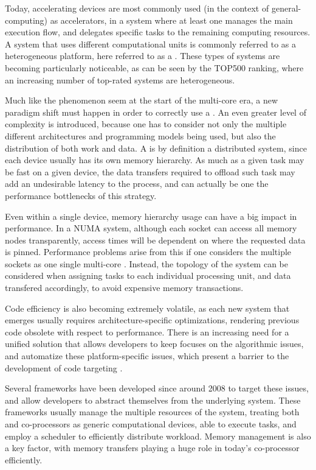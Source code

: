 \documentclass[main.tex]{subfiles}
\begin{document}
Today, accelerating devices are most commonly used (in the context of general-computing) as accelerators, in a system where at least one \cpu manages the main execution flow, and delegates specific tasks to the remaining computing resources. A system that uses different computational units is commonly referred to as a heterogeneous platform, here referred to as a \hetplat. These types of systems are becoming particularly noticeable, as can be seen by the TOP500 ranking, where an increasing number of top-rated systems are heterogeneous.

Much like the phenomenon seem at the start of the multi-core era, a new paradigm shift must happen in order to correctly use a \hetplat. An even greater level of complexity is introduced, because one has to consider not only the multiple different architectures and programming models being used, but also the distribution of both work and data. A \hetplat is by definition a distributed system, since each device usually has its own memory hierarchy. As much as a given task may be fast on a given device, the data transfers required to offload such task may add an undesirable latency to the process, and can actually be one the performance bottlenecks of this strategy.

Even within a single device, memory hierarchy usage can have a big impact in performance. In a \acs{NUMA} system, although each socket can access all memory nodes transparently, access times will be dependent on where the requested data is pinned. Performance problems arise from this if one considers the multiple sockets as one single multi-core \cpu. Instead, the topology of the system can be considered when assigning tasks to each individual processing unit, and data transfered accordingly, to avoid expensive memory transactions.

Code efficiency is also becoming extremely volatile, as each new system that emerges usually requires architecture-specific optimizations, rendering previous code obsolete with respect to performance. There is an increasing need for a unified solution that allows developers to keep focuses on the algorithmic issues, and automatize these platform-specific issues, which present a barrier to the development of code targeting \hetplats.

Several frameworks have been developed since around 2008 to target these issues, and allow developers to abstract themselves from the underlying system. These frameworks usually manage the multiple resources of the system, treating both \cpus and co-processors as generic computational devices, able to execute tasks, and employ a scheduler to efficiently distribute workload. Memory management is also a key factor, with memory transfers playing a huge role in today's co-processor efficiently.
\end{document}

